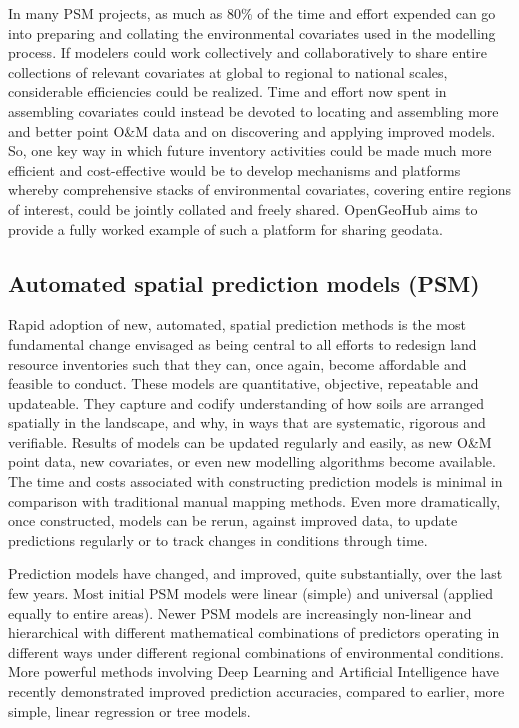 \documentclass[graybox,natbib,nospthms,UStrade]{svmono}
\begin{document}
In many PSM projects, as much as 80\% of the time and effort expended can
go into preparing and collating the environmental covariates used in the
modelling process. If modelers could work collectively and
collaboratively to share entire collections of relevant covariates at
global to regional to national scales, considerable efficiencies could
be realized. Time and effort now spent in assembling covariates could
instead be devoted to locating and assembling more and better point O\&M
data and on discovering and applying improved models. So, one key way in
which future inventory activities could be made much more efficient and
cost-effective would be to develop mechanisms and platforms whereby
comprehensive stacks of environmental covariates, covering entire
regions of interest, could be jointly collated and freely shared.
OpenGeoHub aims to provide a fully worked example of such a platform for
sharing geodata.

\hypertarget{automated-spatial-prediction-models-psm}{%
\subsection{Automated spatial prediction models (PSM)}\label{automated-spatial-prediction-models-psm}}

Rapid adoption of new, automated, spatial prediction methods is the most
fundamental change envisaged as being central to all efforts to redesign
land resource inventories such that they can, once again, become
affordable and feasible to conduct. These models are quantitative,
objective, repeatable and updateable. They capture and codify
understanding of how soils are arranged spatially in the landscape, and
why, in ways that are systematic, rigorous and verifiable. Results of
models can be updated regularly and easily, as new O\&M point data, new
covariates, or even new modelling algorithms become available. The time
and costs associated with constructing prediction models is minimal in
comparison with traditional manual mapping methods. Even more
dramatically, once constructed, models can be rerun, against improved
data, to update predictions regularly or to track changes in conditions
through time.

Prediction models have changed, and improved, quite substantially, over
the last few years. Most initial PSM models were linear (simple) and
universal (applied equally to entire areas). Newer PSM models are
increasingly non-linear and hierarchical with different mathematical
combinations of predictors operating in different ways under different
regional combinations of environmental conditions. More powerful methods
involving Deep Learning and Artificial Intelligence have recently
demonstrated improved prediction accuracies, compared to earlier, more
simple, linear regression or tree models.
\end{document}
